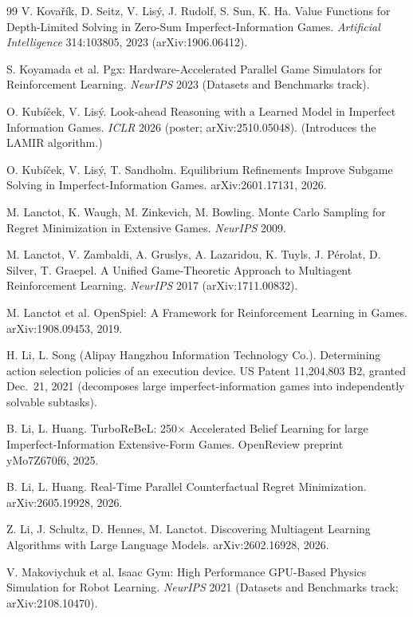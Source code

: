 \documentclass[11pt]{article}
\begin{document}
\begin{thebibliography}{99}
 V. Kovařík, D. Seitz, V. Lisý, J. Rudolf, S. Sun, K. Ha.
Value Functions for Depth-Limited Solving in Zero-Sum Imperfect-Information Games.
\emph{Artificial Intelligence} 314:103805, 2023 (arXiv:1906.06412).

 S. Koyamada et al. Pgx: Hardware-Accelerated Parallel Game
Simulators for Reinforcement Learning. \emph{NeurIPS} 2023 (Datasets and Benchmarks
track).

 O. Kubíček, V. Lisý. Look-ahead Reasoning with a Learned Model in
Imperfect Information Games. \emph{ICLR} 2026 (poster; arXiv:2510.05048). (Introduces
the LAMIR algorithm.)

 O. Kubíček, V. Lisý, T. Sandholm. Equilibrium Refinements Improve
Subgame Solving in Imperfect-Information Games. arXiv:2601.17131, 2026.

 M. Lanctot, K. Waugh, M. Zinkevich, M. Bowling. Monte Carlo
Sampling for Regret Minimization in Extensive Games. \emph{NeurIPS} 2009.

 M. Lanctot, V. Zambaldi, A. Gruslys, A. Lazaridou, K. Tuyls,
J. Pérolat, D. Silver, T. Graepel. A Unified Game-Theoretic Approach to Multiagent
Reinforcement Learning. \emph{NeurIPS} 2017 (arXiv:1711.00832).

 M. Lanctot et al. OpenSpiel: A Framework for Reinforcement
Learning in Games. arXiv:1908.09453, 2019.

 H. Li, L. Song (Alipay Hangzhou Information Technology Co.).
Determining action selection policies of an execution device. US Patent 11,204,803 B2,
granted Dec.\ 21, 2021 (decomposes large imperfect-information games into independently
solvable subtasks).

 B. Li, L. Huang. TurboReBeL: 250$\times$ Accelerated Belief
Learning for large Imperfect-Information Extensive-Form Games. OpenReview preprint
yMo7Z670f6, 2025.

 B. Li, L. Huang. Real-Time Parallel Counterfactual Regret
Minimization. arXiv:2605.19928, 2026.

 Z. Li, J. Schultz, D. Hennes, M. Lanctot. Discovering
Multiagent Learning Algorithms with Large Language Models. arXiv:2602.16928, 2026.

 V. Makoviychuk et al. Isaac Gym: High Performance GPU-Based
Physics Simulation for Robot Learning. \emph{NeurIPS} 2021 (Datasets and Benchmarks
track; arXiv:2108.10470).


\end{thebibliography}
\end{document}
